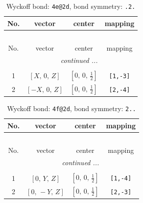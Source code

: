 \documentclass[fleqn,8pt]{jsarticle}
\begin{document}
\renewcommand{\arraystretch}{1.2}
\begin{longtable}{cccc}
\caption{Wyckoff bond: {\tt 4e@2d}, bond symmetry: {\tt .2.}}
 \\
 \hline \hline
No. & vector & center & mapping \\ \hline \endfirsthead

\multicolumn{3}{l}{\tablename\ \thetable{}} \\
 \hline \hline
No. & vector & center & mapping \\ \hline \endhead

 \hline \hline
\multicolumn{3}{r}{\footnotesize\it continued ...} \\ \endfoot

 \hline \hline
\multicolumn{3}{r}{} \\ \endlastfoot

1 & $\left[ X,\, 0,\, Z \right]$ & $\left[ 0,\, 0,\, \frac{1}{2} \right]$ & {\tt [1,-3]} \\ \hline
2 & $\left[ - X,\, 0,\, Z \right]$ & $\left[ 0,\, 0,\, \frac{1}{2} \right]$ & {\tt [2,-4]} \\
\end{longtable}
\renewcommand{\arraystretch}{1.2}
\begin{longtable}{cccc}
\caption{Wyckoff bond: {\tt 4f@2d}, bond symmetry: {\tt 2..}}
 \\
 \hline \hline
No. & vector & center & mapping \\ \hline \endfirsthead

\multicolumn{3}{l}{\tablename\ \thetable{}} \\
 \hline \hline
No. & vector & center & mapping \\ \hline \endhead

 \hline \hline
\multicolumn{3}{r}{\footnotesize\it continued ...} \\ \endfoot

 \hline \hline
\multicolumn{3}{r}{} \\ \endlastfoot

1 & $\left[ 0,\, Y,\, Z \right]$ & $\left[ 0,\, 0,\, \frac{1}{2} \right]$ & {\tt [1,-4]} \\ \hline
2 & $\left[ 0,\, - Y,\, Z \right]$ & $\left[ 0,\, 0,\, \frac{1}{2} \right]$ & {\tt [2,-3]} \\
\end{longtable}
\renewcommand{\arraystretch}{1.2}
\end{document}
